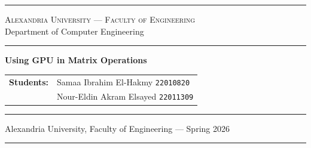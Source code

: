 \documentclass[12pt, a4paper]{article}
\begin{document}
\begin{titlepage}
\thispagestyle{empty}

\begin{center}

\vspace*{0.5cm}

{\color{alexblue}\rule{\linewidth}{2pt}}
\vspace{0.3cm}

{\color{alexblue}\large\textsc{Alexandria University --- Faculty of Engineering}}\\[0.15cm]
{\color{gray}\large Department of Computer Engineering}

\vspace{0.3cm}
{\color{alexblue}\rule{\linewidth}{0.5pt}}

\vspace{1.8cm}

{\color{alexblue}\fontsize{26}{32}\selectfont\bfseries
Using GPU in Matrix Operations}

\vspace{0.6cm}

\vspace{1.5cm}


\vspace{2cm}

\begin{tabular}{rl}
  \color{gray}\textbf{Students:}  & \color{alexblue} Samaa Ibrahim El-Hakmy \quad \texttt{22010820} \\[4pt]
                                  & \color{alexblue} Nour-Eldin Akram Elsayed \quad \texttt{22011309} \\[4pt]
\end{tabular}

\vfill

{\color{alexblue}\rule{\linewidth}{0.5pt}}
\vspace{0.2cm}
{\color{gray}\small Alexandria University, Faculty of Engineering --- Spring 2026}
{\color{alexblue}\rule{\linewidth}{2pt}}

\end{center}
\end{titlepage}
\end{document}
